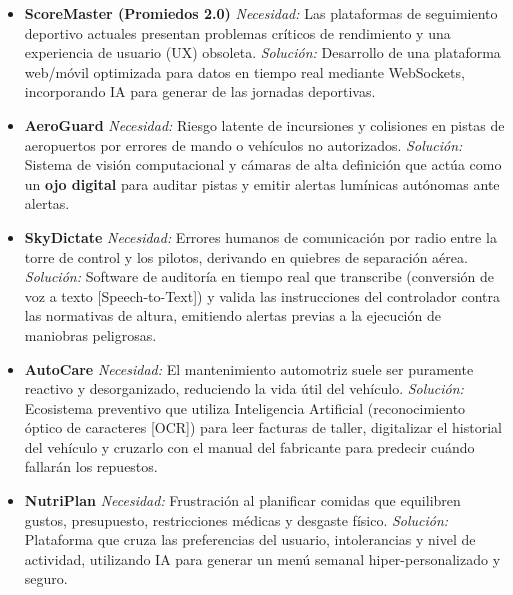 \begin{itemize}
    \item \textbf{ScoreMaster (Promiedos 2.0)} 
    \newline \textit{Necesidad:} Las plataformas de seguimiento deportivo actuales presentan problemas críticos de rendimiento y una experiencia de usuario (UX) obsoleta. 
    \newline \textit{Solución:} Desarrollo de una plataforma web/móvil optimizada para datos en tiempo real mediante WebSockets, incorporando IA para generar de las jornadas deportivas.
    
    \item \textbf{AeroGuard}
    \newline \textit{Necesidad:} Riesgo latente de incursiones y colisiones en pistas de aeropuertos por errores de mando o vehículos no autorizados.
    \newline \textit{Solución:} Sistema de visión computacional y cámaras de alta definición que actúa como un \textbf{ojo digital} para auditar pistas y emitir alertas lumínicas autónomas ante alertas.
    
    \item \textbf{SkyDictate}
    \newline \textit{Necesidad:} Errores humanos de comunicación por radio entre la torre de control y los pilotos, derivando en quiebres de separación aérea.
    \newline \textit{Solución:} Software de auditoría en tiempo real que transcribe (conversión de voz a texto [Speech-to-Text]) y valida las instrucciones del controlador contra las normativas de altura, emitiendo alertas previas a la ejecución de maniobras peligrosas.

    \item \textbf{AutoCare}
    \newline \textit{Necesidad:} El mantenimiento automotriz suele ser puramente reactivo y desorganizado, reduciendo la vida útil del vehículo.
    \newline \textit{Solución:} Ecosistema preventivo que utiliza Inteligencia Artificial (reconocimiento óptico de caracteres [OCR]) para leer facturas de taller, digitalizar el historial del vehículo y cruzarlo con el manual del fabricante para predecir cuándo fallarán los repuestos.

    \item \textbf{NutriPlan}
    \newline \textit{Necesidad:} Frustración al planificar comidas que equilibren gustos, presupuesto, restricciones médicas y desgaste físico.
    \newline \textit{Solución:} Plataforma que cruza las preferencias del usuario, intolerancias y nivel de actividad, utilizando IA para generar un menú semanal hiper-personalizado y seguro.


\end{itemize}
